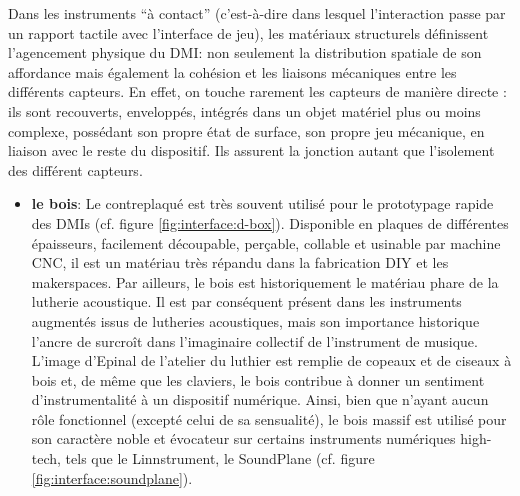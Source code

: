 \noindent Dans les instruments ``à contact'' (c'est-à-dire dans lesquel l'interaction passe par un rapport tactile avec l'interface de jeu), les matériaux structurels définissent l'agencement physique du \gls{DMI}: non seulement la distribution spatiale de son affordance mais également la cohésion et les liaisons mécaniques entre les différents capteurs. En effet, on touche rarement les capteurs de manière directe : ils sont recouverts, enveloppés, intégrés dans un objet matériel plus ou moins complexe, possédant son propre état de surface, son propre jeu mécanique, en liaison avec le reste du dispositif. Ils assurent la jonction autant que l'isolement des différent capteurs.
\vspace{-1em}
\begin{itemize}[noitemsep]
	\item \textbf{le bois}: Le contreplaqué est très souvent utilisé pour le prototypage rapide des \glspl{DMI} (cf. figure \ref{fig:interface:d-box}). Disponible en plaques de différentes épaisseurs, facilement découpable, perçable, collable et usinable par machine \gls{CNC}, il est un matériau très répandu dans la fabrication \gls{DIY} et les \glspl{makerspace}. Par ailleurs, le bois est historiquement le matériau phare de la lutherie acoustique. Il est par conséquent présent dans les instruments augmentés issus de lutheries acoustiques, mais son importance historique l'ancre de surcroît dans l'imaginaire collectif de l'instrument de musique. L'image d'Epinal de l'atelier du luthier est remplie de copeaux et de ciseaux à bois et, de même que les claviers, le bois contribue à donner un sentiment d'instrumentalité à un dispositif numérique. Ainsi, bien que n'ayant aucun rôle fonctionnel (excepté celui de sa sensualité), le bois massif est utilisé pour son caractère noble et évocateur sur certains instruments numériques high-tech, tels que le Linnstrument, le SoundPlane (cf. figure \ref{fig:interface:soundplane}).
	\begin{figure}[!htbp]
\end{figure}
\end{itemize}
